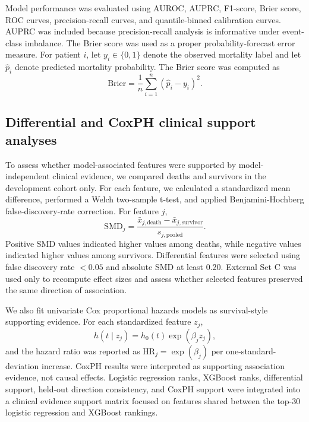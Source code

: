 \documentclass[10pt,twocolumn,letterpaper]{article}
\begin{document}
Model performance was evaluated using AUROC, AUPRC, F1-score, Brier score, ROC curves, precision-recall curves, and quantile-binned calibration curves. AUPRC was included because precision-recall analysis is informative under event-class imbalance\cite{saito2015pr}. The Brier score was used as a proper probability-forecast error measure\cite{brier1950}. For patient $i$, let $y_i \in \{0,1\}$ denote the observed mortality label and let $\hat{p}_i$ denote predicted mortality probability. The Brier score was computed as
\begin{equation}
\mathrm{Brier}
=
\frac{1}{n}
\sum_{i=1}^{n}
(\hat{p}_i-y_i)^2.
\end{equation}

\subsection{Differential and CoxPH clinical support analyses}

To assess whether model-associated features were supported by model-independent clinical evidence, we compared deaths and survivors in the development cohort only. For each feature, we calculated a standardized mean difference, performed a Welch two-sample t-test, and applied Benjamini-Hochberg false-discovery-rate correction\cite{benjamini1995fdr}. For feature $j$,
\begin{equation}
\mathrm{SMD}_j
=
\frac{
\bar{x}_{j,\mathrm{death}}-\bar{x}_{j,\mathrm{survivor}}
}{
s_{j,\mathrm{pooled}}
}.
\end{equation}
Positive SMD values indicated higher values among deaths, while negative values indicated higher values among survivors. Differential features were selected using false discovery rate $<0.05$ and absolute SMD at least 0.20. External Set C was used only to recompute effect sizes and assess whether selected features preserved the same direction of association.

We also fit univariate Cox proportional hazards models as survival-style supporting evidence\cite{cox1972regression}. For each standardized feature $z_j$,
\begin{equation}
h(t \mid z_j)=h_0(t)\exp(\beta_j z_j),
\end{equation}
and the hazard ratio was reported as $\mathrm{HR}_j=\exp(\beta_j)$ per one-standard-deviation increase. CoxPH results were interpreted as supporting association evidence, not causal effects. Logistic regression ranks, XGBoost ranks, differential support, held-out direction consistency, and CoxPH support were integrated into a clinical evidence support matrix focused on features shared between the top-30 logistic regression and XGBoost rankings.
\end{document}
